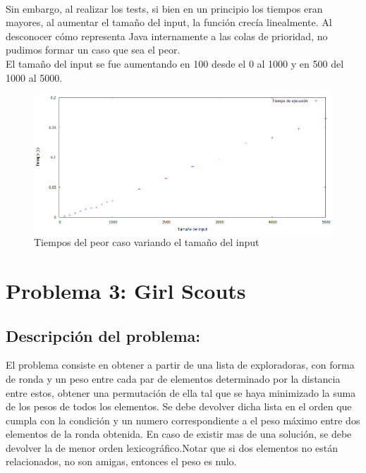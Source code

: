 \documentclass[10pt, a4paper]{article}
\begin{document}
	\\Sin embargo, al realizar los tests, si bien en un principio los tiempos eran mayores, al aumentar el tama\~no  del input, la funci\'on crec\'ia linealmente. Al desconocer c\'omo representa Java internamente a las colas de prioridad, no pudimos formar un caso que sea el peor.
	\\El tama\~no del input se fue aumentando en 100 desde el 0 al 1000 y en 500 del 1000 al 5000.
	\begin{figure}
  		\centering
   	 	\includegraphics[width=1\textwidth]
   	 	{Imagenes/medianaPeorTiempos.png}
		\caption{Tiempos del peor caso variando el tama\~no del input}
	\end{figure}

\section{Problema 3: Girl Scouts}
\subsection{Descripción del problema:}


El problema consiste en obtener a partir de una lista de exploradoras, con forma de ronda y un peso entre cada par de elementos determinado por la distancia entre estos, 
obtener una permutación de ella tal que se haya minimizado la suma de los pesos de todos los elementos. Se debe devolver dicha lista en el orden que cumpla con 
la condición y un numero correspondiente a el peso máximo entre dos elementos de la ronda obtenida. En caso de existir mas de una solución, se debe devolver la de menor
orden lexicográfico.Notar que si dos elementos no están relacionados, no son amigas, entonces el peso es nulo.
\end{document}
